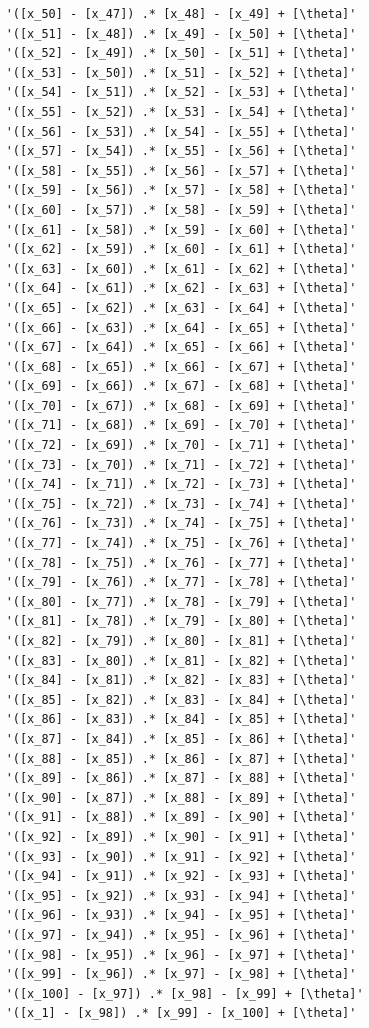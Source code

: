 \begin{verbatim}
    '([x_50] - [x_47]) .* [x_48] - [x_49] + [\theta]'
    '([x_51] - [x_48]) .* [x_49] - [x_50] + [\theta]'
    '([x_52] - [x_49]) .* [x_50] - [x_51] + [\theta]'
    '([x_53] - [x_50]) .* [x_51] - [x_52] + [\theta]'
    '([x_54] - [x_51]) .* [x_52] - [x_53] + [\theta]'
    '([x_55] - [x_52]) .* [x_53] - [x_54] + [\theta]'
    '([x_56] - [x_53]) .* [x_54] - [x_55] + [\theta]'
    '([x_57] - [x_54]) .* [x_55] - [x_56] + [\theta]'
    '([x_58] - [x_55]) .* [x_56] - [x_57] + [\theta]'
    '([x_59] - [x_56]) .* [x_57] - [x_58] + [\theta]'
    '([x_60] - [x_57]) .* [x_58] - [x_59] + [\theta]'
    '([x_61] - [x_58]) .* [x_59] - [x_60] + [\theta]'
    '([x_62] - [x_59]) .* [x_60] - [x_61] + [\theta]'
    '([x_63] - [x_60]) .* [x_61] - [x_62] + [\theta]'
    '([x_64] - [x_61]) .* [x_62] - [x_63] + [\theta]'
    '([x_65] - [x_62]) .* [x_63] - [x_64] + [\theta]'
    '([x_66] - [x_63]) .* [x_64] - [x_65] + [\theta]'
    '([x_67] - [x_64]) .* [x_65] - [x_66] + [\theta]'
    '([x_68] - [x_65]) .* [x_66] - [x_67] + [\theta]'
    '([x_69] - [x_66]) .* [x_67] - [x_68] + [\theta]'
    '([x_70] - [x_67]) .* [x_68] - [x_69] + [\theta]'
    '([x_71] - [x_68]) .* [x_69] - [x_70] + [\theta]'
    '([x_72] - [x_69]) .* [x_70] - [x_71] + [\theta]'
    '([x_73] - [x_70]) .* [x_71] - [x_72] + [\theta]'
    '([x_74] - [x_71]) .* [x_72] - [x_73] + [\theta]'
    '([x_75] - [x_72]) .* [x_73] - [x_74] + [\theta]'
    '([x_76] - [x_73]) .* [x_74] - [x_75] + [\theta]'
    '([x_77] - [x_74]) .* [x_75] - [x_76] + [\theta]'
    '([x_78] - [x_75]) .* [x_76] - [x_77] + [\theta]'
    '([x_79] - [x_76]) .* [x_77] - [x_78] + [\theta]'
    '([x_80] - [x_77]) .* [x_78] - [x_79] + [\theta]'
    '([x_81] - [x_78]) .* [x_79] - [x_80] + [\theta]'
    '([x_82] - [x_79]) .* [x_80] - [x_81] + [\theta]'
    '([x_83] - [x_80]) .* [x_81] - [x_82] + [\theta]'
    '([x_84] - [x_81]) .* [x_82] - [x_83] + [\theta]'
    '([x_85] - [x_82]) .* [x_83] - [x_84] + [\theta]'
    '([x_86] - [x_83]) .* [x_84] - [x_85] + [\theta]'
    '([x_87] - [x_84]) .* [x_85] - [x_86] + [\theta]'
    '([x_88] - [x_85]) .* [x_86] - [x_87] + [\theta]'
    '([x_89] - [x_86]) .* [x_87] - [x_88] + [\theta]'
    '([x_90] - [x_87]) .* [x_88] - [x_89] + [\theta]'
    '([x_91] - [x_88]) .* [x_89] - [x_90] + [\theta]'
    '([x_92] - [x_89]) .* [x_90] - [x_91] + [\theta]'
    '([x_93] - [x_90]) .* [x_91] - [x_92] + [\theta]'
    '([x_94] - [x_91]) .* [x_92] - [x_93] + [\theta]'
    '([x_95] - [x_92]) .* [x_93] - [x_94] + [\theta]'
    '([x_96] - [x_93]) .* [x_94] - [x_95] + [\theta]'
    '([x_97] - [x_94]) .* [x_95] - [x_96] + [\theta]'
    '([x_98] - [x_95]) .* [x_96] - [x_97] + [\theta]'
    '([x_99] - [x_96]) .* [x_97] - [x_98] + [\theta]'
    '([x_100] - [x_97]) .* [x_98] - [x_99] + [\theta]'
    '([x_1] - [x_98]) .* [x_99] - [x_100] + [\theta]'

\end{verbatim}
\color{black}
    

